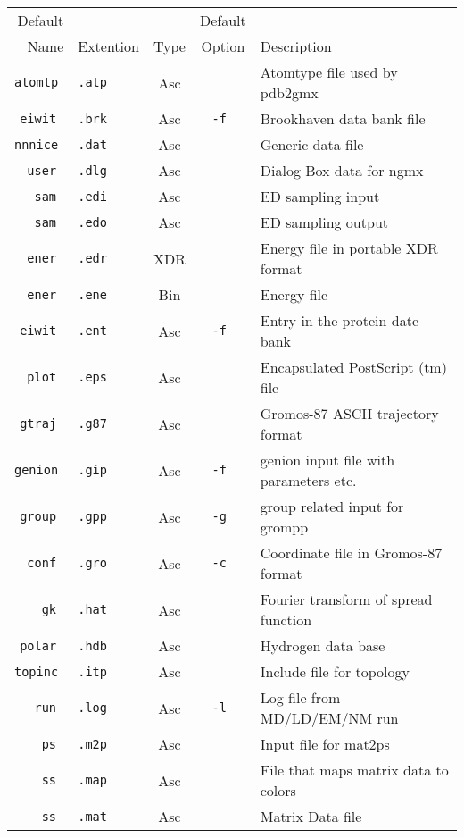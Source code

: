 \begin{table}[p]
\begin{tabularx}{\linewidth}{rlccX}
\hline
   Default  &         &     & Default & \\
   Name     & Extention & Type& Option  & Description \\
\hline
\tt  atomtp &\tt .atp & Asc &\tt    & Atomtype file used by pdb2gmx \\
\tt   eiwit &\tt .brk & Asc &\tt -f & Brookhaven data bank file \\
\tt  nnnice &\tt .dat & Asc &\tt    & Generic data file \\
\tt    user &\tt .dlg & Asc &\tt    & Dialog Box data for ngmx \\
\tt     sam &\tt .edi & Asc &\tt    & ED sampling input \\
\tt     sam &\tt .edo & Asc &\tt    & ED sampling output \\
\tt    ener &\tt .edr & XDR &\tt    & Energy file in portable XDR format \\
\tt    ener &\tt .ene & Bin &\tt    & Energy file \\
\tt   eiwit &\tt .ent & Asc &\tt -f & Entry in the protein date bank \\
\tt    plot &\tt .eps & Asc &\tt    & Encapsulated PostScript (tm) file \\
\tt   gtraj &\tt .g87 & Asc &\tt    & Gromos-87 ASCII trajectory format \\
\tt  genion &\tt .gip & Asc &\tt -f & genion input file with parameters etc. \\
\tt   group &\tt .gpp & Asc &\tt -g & group related input for grompp \\
\tt    conf &\tt .gro & Asc &\tt -c & Coordinate file in Gromos-87 format \\
\tt      gk &\tt .hat & Asc &\tt    & Fourier transform of spread function \\
\tt   polar &\tt .hdb & Asc &\tt    & Hydrogen data base \\
\tt  topinc &\tt .itp & Asc &\tt    & Include file for topology \\
\tt     run &\tt .log & Asc &\tt -l & Log file from MD/LD/EM/NM run \\
\tt      ps &\tt .m2p & Asc &\tt    & Input file for mat2ps \\
\tt      ss &\tt .map & Asc &\tt    & File that maps matrix data to colors \\
\tt      ss &\tt .mat & Asc &\tt    & Matrix Data file \\

\end{tabularx}
\end{table}
